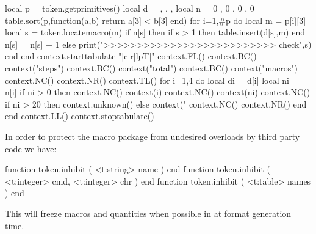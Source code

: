 \startluacode
local p = token.getprimitives()
local d = { { }, { }, { }, { } }
local n = {  0 ,  0 ,  0 ,  0  }
table.sort(p,function(a,b) return a[3] < b[3] end)
for i=1,#p do
    local m = p[i][3]
    local s = token.locatemacro(m)
    if n[s] then
        if s > 1 then
            table.insert(d[s],m)
        end
        n[s] = n[s] + 1
    else
        print(">>>>>>>>>>>>>>>>>>>>>>>>>> check",s)
    end
end
context.starttabulate { "|c|r|lpT|" }
context.FL()
context.BC() context("steps")
context.BC() context("total")
context.BC() context("macros")
context.NC() context.NR()
context.TL()
for i=1,4 do
    local di = d[i]
    local ni = n[i]
    if ni > 0 then
        context.NC() context(i)
        context.NC() context(ni)
        context.NC() if ni > 20 then context.unknown() else context("%
        context.NC() context.NR()
    end
end
context.LL()
context.stoptabulate()
\stopluacode

\stopsubsection

\startsubsection[title={special purpose}]

In order to protect the macro package from undesired overloads by third party
code we have:

\starttyping[option=LUA]
function token.inhibit ( <t:string> name ) end
function token.inhibit ( <t:integer> cmd, <t:integer> chr ) end
function token.inhibit ( <t:table> names ) end
\stoptyping

This will freeze macros and quantities when possible in at format generation
time.

\stopsubsection

\stopsection

\stopdocument


